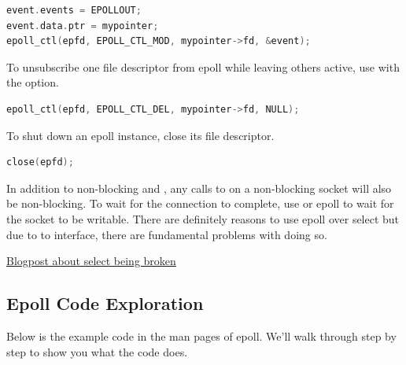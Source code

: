 \begin{lstlisting}[language=C]
event.events = EPOLLOUT;
event.data.ptr = mypointer;
epoll_ctl(epfd, EPOLL_CTL_MOD, mypointer->fd, &event);
\end{lstlisting}

To unsubscribe one file descriptor from epoll while leaving others active, use  with the  option.

\begin{lstlisting}[language=C]
epoll_ctl(epfd, EPOLL_CTL_DEL, mypointer->fd, NULL);
\end{lstlisting}

To shut down an epoll instance, close its file descriptor.

\begin{lstlisting}[language=C]
close(epfd);
\end{lstlisting}

In addition to non-blocking  and , any calls to  on a non-blocking socket will also be non-blocking.
To wait for the connection to complete, use  or epoll to wait for the socket to be writable.
There are definitely reasons to use epoll over select but due to to interface, there are fundamental problems with doing so.

\href{https://idea.popcount.org/2017-01-06-select-is-fundamentally-broken/}{Blogpost about select being broken}

\subsection{Epoll Code Exploration}

Below is the example code in the man pages of epoll. We'll walk through step by step to show you what the code does.

